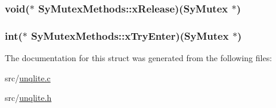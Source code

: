 \hypertarget{struct_sy_mutex_methods_a0841b6ccb4bcb69426e9c8c50e953a98}{
\subsubsection[{x\-Release}]{\setlength{\rightskip}{0pt plus 5cm}void($\ast$ Sy\-Mutex\-Methods\-::x\-Release)({\bf Sy\-Mutex} $\ast$)}}\label{d9/d6f/struct_sy_mutex_methods_a0841b6ccb4bcb69426e9c8c50e953a98}
\hypertarget{struct_sy_mutex_methods_aec1f9171718b6e559801bdf519467aeb}{
\subsubsection[{x\-Try\-Enter}]{\setlength{\rightskip}{0pt plus 5cm}int($\ast$ Sy\-Mutex\-Methods\-::x\-Try\-Enter)({\bf Sy\-Mutex} $\ast$)}}\label{d9/d6f/struct_sy_mutex_methods_aec1f9171718b6e559801bdf519467aeb}


The documentation for this struct was generated from the following files\-:\begin{DoxyCompactItemize}
\item 
src/\hyperlink{unqlite_8c}{unqlite.\-c}\item 
src/\hyperlink{unqlite_8h}{unqlite.\-h}\end{DoxyCompactItemize}
